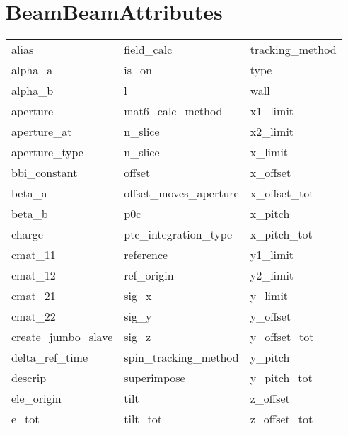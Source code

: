  \section{BeamBeamAttributes}
 \label{s:list.beambeam}
 
 \begin{tabular}{lll} \toprule
alias                       & field_calc                  & tracking_method             \\
alpha_a                     & is_on                       & type                        \\
alpha_b                     & l                           & wall                        \\
aperture                    & mat6_calc_method            & x1_limit                    \\
aperture_at                 & n_slice                     & x2_limit                    \\
aperture_type               & n_slice                     & x_limit                     \\
bbi_constant                & offset                      & x_offset                    \\
beta_a                      & offset_moves_aperture       & x_offset_tot                \\
beta_b                      & p0c                         & x_pitch                     \\
charge                      & ptc_integration_type        & x_pitch_tot                 \\
cmat_11                     & reference                   & y1_limit                    \\
cmat_12                     & ref_origin                  & y2_limit                    \\
cmat_21                     & sig_x                       & y_limit                     \\
cmat_22                     & sig_y                       & y_offset                    \\
create_jumbo_slave          & sig_z                       & y_offset_tot                \\
delta_ref_time              & spin_tracking_method        & y_pitch                     \\
descrip                     & superimpose                 & y_pitch_tot                 \\
ele_origin                  & tilt                        & z_offset                    \\
e_tot                       & tilt_tot                    & z_offset_tot                \\
 \bottomrule
 \end{tabular}
 \vfill
 
